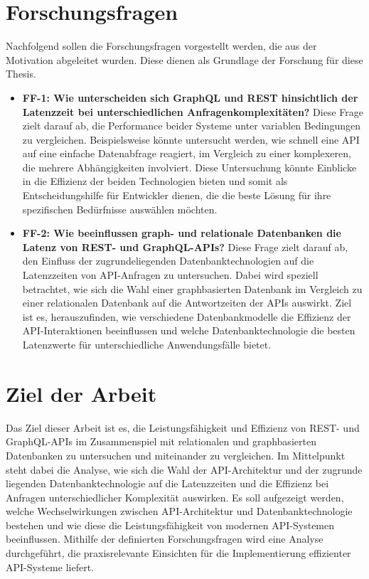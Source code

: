 \section{Forschungsfragen} %
\label{sec:forschungsfragen}
Nachfolgend sollen die Forschungsfragen vorgestellt werden, die aus der Motivation abgeleitet wurden. Diese dienen als Grundlage der Forschung für diese Thesis.
\begin{itemize}
	\item \textbf{FF-1: Wie unterscheiden sich GraphQL und REST hinsichtlich der Latenzzeit bei unterschiedlichen Anfragenkomplexitäten?}  Diese Frage zielt darauf ab, die Performance beider Systeme unter variablen Bedingungen zu vergleichen. Beispielsweise könnte untersucht werden, wie schnell eine API auf eine einfache Datenabfrage reagiert, im Vergleich zu einer komplexeren, die mehrere Abhängigkeiten involviert. Diese Untersuchung könnte Einblicke in die Effizienz der beiden Technologien bieten und somit als Entscheidungshilfe für Entwickler dienen, die die beste Lösung für ihre spezifischen Bedürfnisse auswählen möchten.
	\item \textbf{FF-2: Wie beeinflussen graph- und relationale Datenbanken die Latenz von REST- und GraphQL-APIs?} Diese Frage zielt darauf ab, den Einfluss der zugrundeliegenden Datenbanktechnologien auf die Latenzzeiten von API-Anfragen zu untersuchen. Dabei wird speziell betrachtet, wie sich die Wahl einer graphbasierten Datenbank im Vergleich zu einer relationalen Datenbank auf die Antwortzeiten der APIs auswirkt. Ziel ist es, herauszufinden, wie verschiedene Datenbankmodelle die Effizienz der API-Interaktionen beeinflussen und welche Datenbanktechnologie die besten Latenzwerte für unterschiedliche Anwendungsfälle bietet.
\end{itemize}
\section{Ziel der Arbeit} %
\label{sec:zielderarbeit}
Das Ziel dieser Arbeit ist es, die Leistungsfähigkeit und Effizienz von REST- und GraphQL-APIs im Zusammenspiel mit relationalen und graphbasierten Datenbanken zu untersuchen und miteinander zu vergleichen. Im Mittelpunkt steht dabei die Analyse, wie sich die Wahl der API-Architektur und der zugrunde liegenden Datenbanktechnologie auf die Latenzzeiten und die Effizienz bei Anfragen unterschiedlicher Komplexität auswirken. Es soll aufgezeigt werden, welche Wechselwirkungen zwischen API-Architektur und Datenbanktechnologie bestehen und wie diese die Leistungsfähigkeit von modernen API-Systemen beeinflussen. Mithilfe der definierten Forschungsfragen wird eine Analyse durchgeführt, die praxisrelevante Einsichten für die Implementierung effizienter API-Systeme liefert.
\newpage
